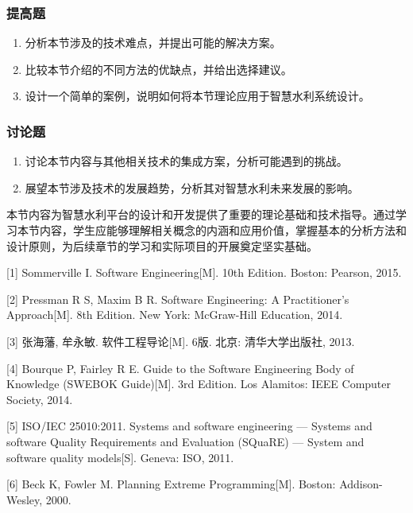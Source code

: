 \documentclass[12pt,a4paper]{article}
\providecommand{\tightlist}{%
  \setlength{\itemsep}{0pt}\setlength{\parskip}{0pt}}
\begin{document}
\subsubsection{提高题}\label{ux63d0ux9ad8ux9898-1}

\begin{enumerate}
\def\labelenumi{\arabic{enumi}.}
\setcounter{enumi}{3}
\tightlist
\item
  分析本节涉及的技术难点，并提出可能的解决方案。
\item
  比较本节介绍的不同方法的优缺点，并给出选择建议。
\item
  设计一个简单的案例，说明如何将本节理论应用于智慧水利系统设计。
\end{enumerate}

\subsubsection{讨论题}\label{ux8ba8ux8bbaux9898-1}

\begin{enumerate}
\def\labelenumi{\arabic{enumi}.}
\setcounter{enumi}{6}
\tightlist
\item
  讨论本节内容与其他相关技术的集成方案，分析可能遇到的挑战。
\item
  展望本节涉及技术的发展趋势，分析其对智慧水利未来发展的影响。
\end{enumerate}

本节内容为智慧水利平台的设计和开发提供了重要的理论基础和技术指导。通过学习本节内容，学生应能够理解相关概念的内涵和应用价值，掌握基本的分析方法和设计原则，为后续章节的学习和实际项目的开展奠定坚实基础。

{[}1{]} Sommerville I. Software Engineering{[}M{]}. 10th Edition.
Boston: Pearson, 2015.

{[}2{]} Pressman R S, Maxim B R. Software Engineering: A Practitioner's
Approach{[}M{]}. 8th Edition. New York: McGraw-Hill Education, 2014.

{[}3{]} 张海藩, 牟永敏. 软件工程导论{[}M{]}. 6版. 北京: 清华大学出版社,
2013.

{[}4{]} Bourque P, Fairley R E. Guide to the Software Engineering Body
of Knowledge (SWEBOK Guide){[}M{]}. 3rd Edition. Los Alamitos: IEEE
Computer Society, 2014.

{[}5{]} ISO/IEC 25010:2011. Systems and software engineering --- Systems
and software Quality Requirements and Evaluation (SQuaRE) --- System and
software quality models{[}S{]}. Geneva: ISO, 2011.

{[}6{]} Beck K, Fowler M. Planning Extreme Programming{[}M{]}. Boston:
Addison-Wesley, 2000.
\end{document}
